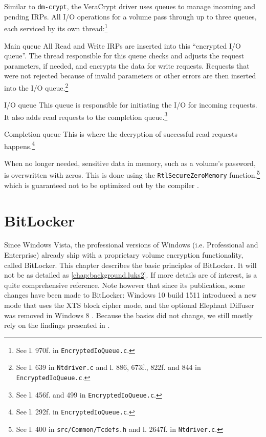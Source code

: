 Similar to \texttt{dm-crypt}, the VeraCrypt driver uses queues to manage incoming and pending IRPs. All I/O operations for a volume pass through up to three queues, each serviced by its own thread:\footnote{\label{fn:otherapproaches.veracrypt.queuecreation} See l. 970f. in \texttt{EncryptedIoQueue.c}.}
\begin{descitemize}
	\item[Main queue] All Read and Write IRPs are inserted into this ``encrypted I/O queue''. The thread responsible for this queue checks and adjusts the request parameters, if needed, and encrypts the data for write requests. Requests that were not rejected because of invalid parameters or other errors are then inserted into the I/O queue.\footnote{\label{fn:otherapproaches.veracrypt.mainqueue} See l. 639 in \texttt{Ntdriver.c} and l. 886, 673f., 822f. and 844 in \texttt{EncryptedIoQueue.c}.}
	\item[I/O queue] This queue is responsible for initiating the I/O for incoming requests. It also adds read requests to the completion queue.\footnote{\label{fn:otherapproaches.veracrypt.ioqueue} See l. 456f. and 499 in \texttt{EncryptedIoQueue.c}.}
	\item[Completion queue] This is where the decryption of successful read requests happens.\footnote{\label{fn:otherapproaches.veracrypt.completionqueue} See l. 292f. in \texttt{EncryptedIoQueue.c}.}
\end{descitemize}

When no longer needed, sensitive data in memory, such as a volume's password, is overwritten with zeros. This is done using the \texttt{RtlSecureZeroMemory} function,\footnote{\label{fn:otherapproaches.veracrypt.zeromem} See l. 400 in \texttt{src/Common/Tcdefs.h} and l. 2647f. in \texttt{Ntdriver.c}.} which is guaranteed not to be optimized out by the compiler \cite{Wdk}.
%

\section{BitLocker}
\label{chap:otherapproaches.bitlocker}
Since Windows Vista, the professional versions of Windows (i.e. Professional and Enterprise) already ship with a proprietary volume encryption functionality, called BitLocker. This chapter describes the basic principles of BitLocker. It will not be as detailed as \autoref{chap:background.luks2}. If more details are of interest, \cite{Kornblum2009} is a quite comprehensive reference. Note however that since its publication, some changes have been made to BitLocker: Windows 10 build 1511 introduced a new mode that uses the XTS block cipher mode, and the optional Elephant Diffuser was removed in Windows 8 \cite{Sosnowski2016}. Because the basics did not change, we still mostly rely on the findings presented in \cite{Kornblum2009}.

